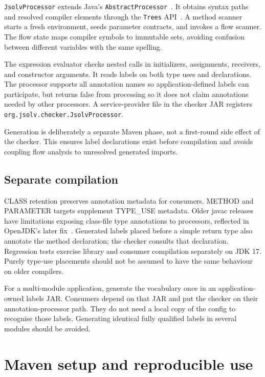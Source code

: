 \documentclass[11pt]{article}
\begin{document}
\texttt{JsolvProcessor} extends Java's \texttt{AbstractProcessor}~\cite{processor}.
It obtains syntax paths and resolved compiler elements through the
\texttt{Trees} API~\cite{trees}. A method scanner starts a fresh environment,
seeds parameter contracts, and invokes a flow scanner. The flow state maps
compiler symbols to immutable sets, avoiding confusion between different
variables with the same spelling.

The expression evaluator checks nested calls in initializers, assignments,
receivers, and constructor arguments. It reads labels on both type uses and
declarations. The processor supports all annotation names so application-defined
labels can participate, but returns false from processing so it does not claim
annotations needed by other processors. A service-provider file in the checker
JAR registers \texttt{org.jsolv.checker.JsolvProcessor}.

Generation is deliberately a separate Maven phase, not a first-round side effect
of the checker. This ensures label declarations exist before compilation and
avoids coupling flow analysis to unresolved generated imports.

\subsection{Separate compilation}

CLASS retention preserves annotation metadata for consumers. METHOD and
PARAMETER targets supplement TYPE\_USE metadata. Older javac releases have
limitations exposing class-file type annotations to processors, reflected in
OpenJDK's later fix~\cite{javac-annotations}. Generated labels placed before a
simple return type also annotate the method declaration; the checker consults
that declaration. Regression tests exercise library and consumer compilation
separately on JDK 17. Purely type-use placements should not be assumed to have
the same behaviour on older compilers.

For a multi-module application, generate the vocabulary once in an
application-owned labels JAR. Consumers depend on that JAR and put the checker
on their annotation-processor path. They do not need a local copy of the config
to recognise those labels. Generating identical fully qualified labels in several
modules should be avoided.

\section{Maven setup and reproducible use}
\label{sec:build}
\end{document}
